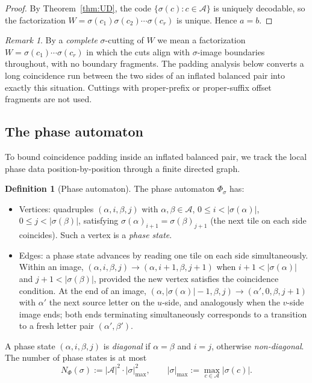 \documentclass[11pt]{article}
\theoremstyle{plain}
\theoremstyle{definition}
\newtheorem{definition}[theorem]{Definition}
\theoremstyle{remark}
\newtheorem{remark}[theorem]{Remark}
\newcommand{\A}{\mathcal{A}}
\begin{document}
\begin{proof}
By Theorem~\ref{thm:UD}, the code $\{\sigma(c):c\in\A\}$ is uniquely decodable, so the factorization $W=\sigma(c_1)\sigma(c_2)\cdots\sigma(c_r)$ is unique. Hence $a=b$.
\end{proof}

\begin{remark}\label{rem:complete-cutting}
By a \emph{complete} $\sigma$-cutting of $W$ we mean a factorization $W=\sigma(c_1)\cdots\sigma(c_r)$ in which the cuts align with $\sigma$-image boundaries throughout, with no boundary fragments. The padding analysis below converts a long coincidence run between the two sides of an inflated balanced pair into exactly this situation. Cuttings with proper-prefix or proper-suffix offset fragments are not used.
\end{remark}

\subsection{The phase automaton}

To bound coincidence padding inside an inflated balanced pair, we track the local phase data position-by-position through a finite directed graph.

\begin{definition}[Phase automaton]\label{def:phase}
The phase automaton $\Phi_\sigma$ has:
\begin{itemize}[leftmargin=*]
\item Vertices: quadruples $(\alpha,i,\beta,j)$ with $\alpha,\beta\in\A$, $0\le i<|\sigma(\alpha)|$, $0\le j<|\sigma(\beta)|$, satisfying $\sigma(\alpha)_{i+1}=\sigma(\beta)_{j+1}$ (the next tile on each side coincides). Such a vertex is a \emph{phase state}.
\item Edges: a phase state advances by reading one tile on each side simultaneously. Within an image, $(\alpha,i,\beta,j)\to(\alpha,i+1,\beta,j+1)$ when $i+1<|\sigma(\alpha)|$ and $j+1<|\sigma(\beta)|$, provided the new vertex satisfies the coincidence condition. At the end of an image, $(\alpha,|\sigma(\alpha)|-1,\beta,j)\to(\alpha',0,\beta,j+1)$ with $\alpha'$ the next source letter on the $u$-side, and analogously when the $v$-side image ends; both ends terminating simultaneously corresponds to a transition to a fresh letter pair $(\alpha',\beta')$.
\end{itemize}
A phase state $(\alpha,i,\beta,j)$ is \emph{diagonal} if $\alpha=\beta$ and $i=j$, otherwise \emph{non-diagonal}. The number of phase states is at most
\[
N_\Phi(\sigma) := |\A|^2\cdot|\sigma|_{\max}^2,\qquad |\sigma|_{\max}:=\max_{c\in\A}|\sigma(c)|.
\]
\end{definition}
\end{document}
